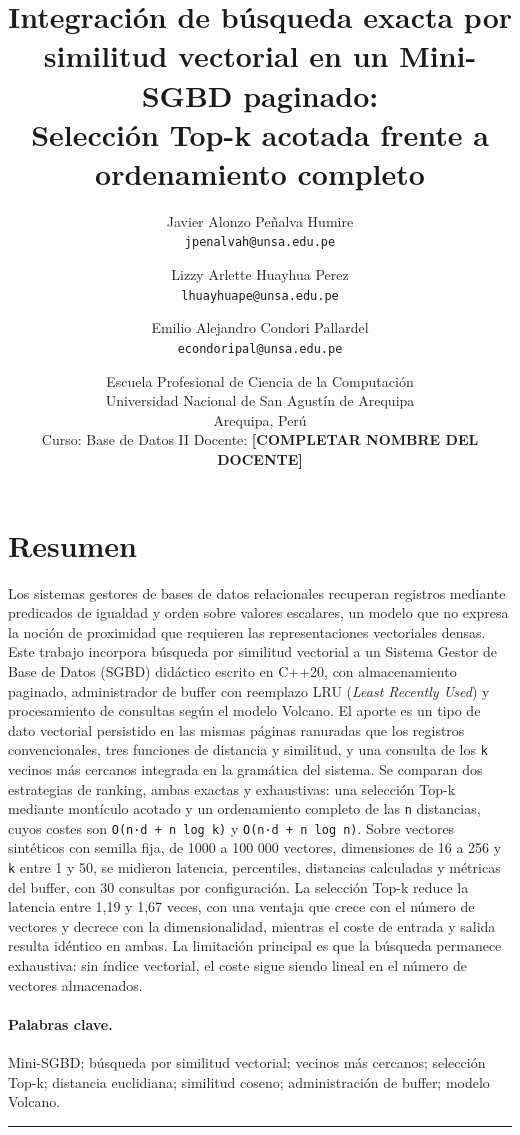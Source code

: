 \documentclass[11pt,a4paper]{article}
\title{\bfseries\color{unsaBlue}Integración de búsqueda exacta por similitud vectorial en un Mini-SGBD paginado:\\[0.35em]
\large Selección Top-k acotada frente a ordenamiento completo}
\author{Javier Alonzo Peñalva Humire\\\texttt{jpenalvah@unsa.edu.pe}
\and Lizzy Arlette Huayhua Perez\\\texttt{lhuayhuape@unsa.edu.pe}
\and Emilio Alejandro Condori Pallardel\\\texttt{econdoripal@unsa.edu.pe}}
\date{\small Escuela Profesional de Ciencia de la Computación\\
Universidad Nacional de San Agustín de Arequipa\\Arequipa, Perú\\[0.5em]
Curso: Base de Datos II \quad Docente: \textbf{[COMPLETAR NOMBRE DEL DOCENTE]}}
\begin{document}
\maketitle
\thispagestyle{empty}

\section*{Resumen}\label{resumen}

Los sistemas gestores de bases de datos relacionales recuperan registros
mediante predicados de igualdad y orden sobre valores escalares, un
modelo que no expresa la noción de proximidad que requieren las
representaciones vectoriales densas. Este trabajo incorpora búsqueda por
similitud vectorial a un Sistema Gestor de Base de Datos (SGBD)
didáctico escrito en C++20, con almacenamiento paginado, administrador
de buffer con reemplazo LRU (\emph{Least Recently Used}) y procesamiento
de consultas según el modelo Volcano. El aporte es un tipo de dato
vectorial persistido en las mismas páginas ranuradas que los registros
convencionales, tres funciones de distancia y similitud, y una consulta
de los \texttt{k} vecinos más cercanos integrada en la gramática del
sistema. Se comparan dos estrategias de ranking, ambas exactas y
exhaustivas: una selección Top-k mediante montículo acotado y un
ordenamiento completo de las \texttt{n} distancias, cuyos costes son
\texttt{O(n·d\ +\ n\ log\ k)} y \texttt{O(n·d\ +\ n\ log\ n)}. Sobre
vectores sintéticos con semilla fija, de 1000 a 100 000 vectores,
dimensiones de 16 a 256 y \texttt{k} entre 1 y 50, se midieron latencia,
percentiles, distancias calculadas y métricas del buffer, con 30
consultas por configuración. La selección Top-k reduce la latencia entre
1,19 y 1,67 veces, con una ventaja que crece con el número de vectores y
decrece con la dimensionalidad, mientras el coste de entrada y salida
resulta idéntico en ambas. La limitación principal es que la búsqueda
permanece exhaustiva: sin índice vectorial, el coste sigue siendo lineal
en el número de vectores almacenados.

\paragraph{Palabras clave.}

Mini-SGBD; búsqueda por similitud vectorial; vecinos más cercanos;
selección Top-k; distancia euclidiana; similitud coseno; administración
de buffer; modelo Volcano.

\vspace{0.6em}\hrule\vspace{1em}
\end{document}
